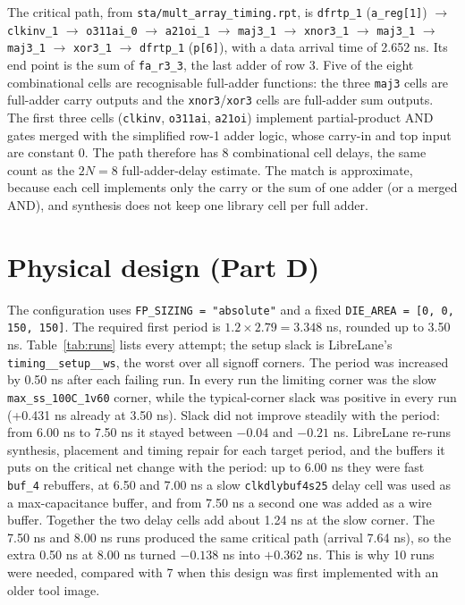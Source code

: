\documentclass[10pt,a4paper]{article}
\newcommand{\code}[1]{\texttt{#1}}
\begin{document}
The critical path, from \code{sta/mult\_array\_timing.rpt}, is
\code{dfrtp\_1} (\code{a\_reg[1]}) $\rightarrow$ \code{clkinv\_1} $\rightarrow$ \code{o311ai\_0} $\rightarrow$ \code{a21oi\_1} $\rightarrow$ \code{maj3\_1} $\rightarrow$ \code{xnor3\_1} $\rightarrow$ \code{maj3\_1} $\rightarrow$ \code{maj3\_1} $\rightarrow$ \code{xor3\_1} $\rightarrow$ \code{dfrtp\_1} (\code{p[6]}), with a data arrival time of 2.652 ns. Its end point is the sum of \code{fa\_r3\_3}, the last adder of row 3. Five of the eight combinational cells are recognisable full-adder functions: the three \code{maj3} cells are full-adder carry outputs and the \code{xnor3}/\code{xor3} cells are full-adder sum outputs. The first three cells (\code{clkinv}, \code{o311ai}, \code{a21oi}) implement partial-product AND gates merged with the simplified row-1 adder logic, whose carry-in and top input are constant 0. The path therefore has 8 combinational cell delays, the same count as the $2N=8$ full-adder-delay estimate. The match is approximate, because each cell implements only the carry or the sum of one adder (or a merged AND), and synthesis does not keep one library cell per full adder.

\section{Physical design (Part D)}\label{sec:pnr}
The configuration uses \code{FP\_SIZING = "absolute"} and a fixed \code{DIE\_AREA = [0, 0, 150, 150]}. The required first period is $1.2\times2.79=3.348$ ns, rounded up to 3.50 ns. Table~\ref{tab:runs} lists every attempt; the setup slack is LibreLane's \code{timing\_\_setup\_\_ws}, the worst over all signoff corners. The period was increased by 0.50 ns after each failing run. In every run the limiting corner was the slow \code{max\_ss\_100C\_1v60} corner, while the typical-corner slack was positive in every run (+0.431 ns already at 3.50 ns). Slack did not improve steadily with the period: from 6.00 ns to 7.50 ns it stayed between $-0.04$ and $-0.21$ ns. LibreLane re-runs synthesis, placement and timing repair for each target period, and the buffers it puts on the critical net change with the period: up to 6.00 ns they were fast \code{buf\_4} rebuffers, at 6.50 and 7.00 ns a slow \code{clkdlybuf4s25} delay cell was used as a max-capacitance buffer, and from 7.50 ns a second one was added as a wire buffer. Together the two delay cells add about 1.24 ns at the slow corner. The 7.50 ns and 8.00 ns runs produced the same critical path (arrival 7.64 ns), so the extra 0.50 ns at 8.00 ns turned $-0.138$ ns into $+0.362$ ns. This is why 10 runs were needed, compared with 7 when this design was first implemented with an older tool image.
\end{document}
